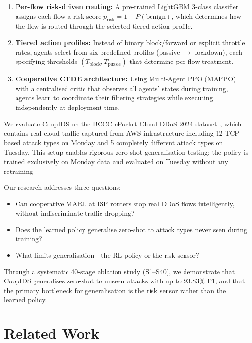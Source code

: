 \documentclass[sigconf,nonacm]{acmart}
\begin{document}
\begin{enumerate}
    \item \textbf{Per-flow risk-driven routing:} A pre-trained LightGBM 3-class classifier assigns each flow a risk score $p_\text{risk} = 1 - P(\text{benign})$, which determines how the flow is routed through the selected tiered action profile.

    \item \textbf{Tiered action profiles:} Instead of binary block/forward or explicit throttle rates, agents select from six predefined profiles (passive $\to$ lockdown), each specifying thresholds $(T_\text{block}, T_\text{puzzle})$ that determine per-flow treatment.

    \item \textbf{Cooperative CTDE architecture:} Using Multi-Agent PPO (MAPPO) with a centralised critic that observes all agents' states during training, agents learn to coordinate their filtering strategies while executing independently at deployment time.
\end{enumerate}

We evaluate CoopIDS on the BCCC-cPacket-Cloud-DDoS-2024 dataset~\cite{bccc2024}, which contains real cloud traffic captured from AWS infrastructure including 12 TCP-based attack types on Monday and 5 completely different attack types on Tuesday. This setup enables rigorous zero-shot generalisation testing: the policy is trained exclusively on Monday data and evaluated on Tuesday without any retraining.

Our research addresses three questions:
\begin{itemize}
    \item[\textbf{RQ1}] Can cooperative MARL at ISP routers stop real DDoS flows intelligently, without indiscriminate traffic dropping?
    \item[\textbf{RQ2}] Does the learned policy generalise zero-shot to attack types never seen during training?
    \item[\textbf{RQ3}] What limits generalisation---the RL policy or the risk sensor?
\end{itemize}

Through a systematic 40-stage ablation study (S1--S40), we demonstrate that CoopIDS generalises zero-shot to unseen attacks with up to 93.83\% F1, and that the primary bottleneck for generalisation is the risk sensor rather than the learned policy.


\section{Related Work}
\label{sec:related}
\end{document}
